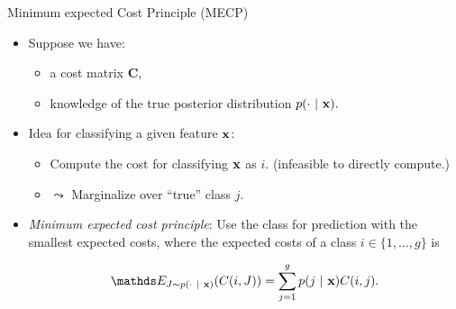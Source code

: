\documentclass[11pt,compress,t,notes=noshow, xcolor=table]{beamer}
\begin{document}
\begin{vbframe}{Minimum expected Cost Principle (MECP)}

	\footnotesize{


		\begin{itemize}\footnotesize
		
			\item Suppose we have:
            \begin{itemize}
                \footnotesize
                \item a cost matrix $\mathbf{C}$,
                \vspace{10pt}
                
                \item knowledge of the true posterior distribution $p(\cdot ~|~ \mathbf{x}).$
                \vspace{10pt}
            \end{itemize}

            \item Idea for classifying a given feature $\mathbf{x}$: 
            \begin{itemize}
                \footnotesize
                \item Compute the cost for classifying $\mathbf{x}$ as $i$. (infeasible to directly compute.)
                \vspace{10pt}
                
                \item $\leadsto$ Marginalize over ``true'' class $j$.
                \vspace{10pt}
            \end{itemize}

			\item \emph{Minimum expected cost principle}: Use the class for prediction with the smallest expected costs, where the expected costs of a class $i\in\{1,\ldots,g\}$ is
	
			$$ 	\E_{J \sim p(\cdot ~|~ \xv)}( C(i,J) ) = \sum_{j=1}^g 	p(j ~|~ \xv) C(i,j).	$$

			
				
		\end{itemize}
	}
\end{vbframe}
\end{document}
